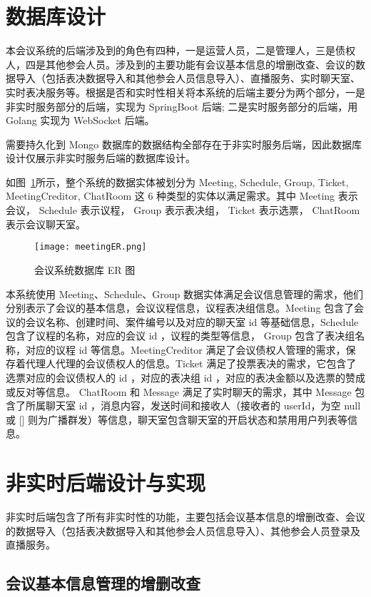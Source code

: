 \section{数据库设计}

本会议系统的后端涉及到的角色有四种，一是运营人员，二是管理人，三是债权人，四是其他参会人员。涉及到的主要功能有会议基本信息的增删改查、会议的数据导入（包括表决数据导入和其他参会人员信息导入）、直播服务、实时聊天室、实时表决服务等。根据是否和实时性相关将本系统的后端主要分为两个部分，一是非实时服务部分的后端，实现为 SpringBoot 后端; 二是实时服务部分的后端，用 Golang 实现为 WebSocket 后端。

需要持久化到 Mongo 数据库的数据结构全部存在于非实时服务后端，因此数据库设计仅展示非实时服务后端的数据库设计。

如图~\ref{fig:meetingER}所示，整个系统的数据实体被划分为 Meeting, Schedule,
Group, Ticket, MeetingCreditor, ChatRoom 这 6 种类型的实体以满足需求。其中 Meeting 表示会议， Schedule 表示议程， Group 表示表决组， Ticket 表示选票， ChatRoom 表示会议聊天室。

\begin{figure}[!htp]
    \centering
    \texttt{[image: meetingER.png]}
    \caption{会议系统数据库 ER 图}
    \label{fig:meetingER}
  \end{figure}

本系统使用 Meeting、Schedule、Group 数据实体满足会议信息管理的需求，他们分别表示了会议的基本信息，会议议程信息，议程表决组信息。Meeting 包含了会议的会议名称、创建时间、案件编号以及对应的聊天室 id 等基础信息，Schedule 包含了议程的名称，对应的会议 id ，议程的类型等信息， Group 包含了表决组名称，对应的议程 id 等信息。MeetingCreditor 满足了会议债权人管理的需求，保存着代理人代理的会议债权人的信息。Ticket 满足了投票表决的需求，它包含了选票对应的会议债权人的 id ，对应的表决组 id ，对应的表决金额以及选票的赞成或反对等信息。 ChatRoom 和 Message 满足了实时聊天的需求，其中 Message 包含了所属聊天室 id ，消息内容，发送时间和接收人（接收者的 userId，为空 null 或 [] 则为广播群发）等信息，聊天室包含聊天室的开启状态和禁用用户列表等信息。

\section{非实时后端设计与实现}
非实时后端包含了所有非实时性的功能，主要包括会议基本信息的增删改查、会议的数据导入（包括表决数据导入和其他参会人员信息导入）、其他参会人员登录及直播服务。


\subsection{会议基本信息管理的增删改查}
